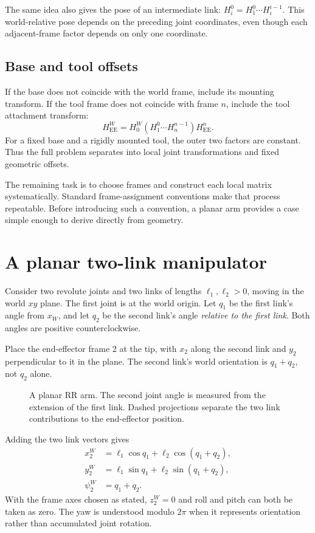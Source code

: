 The same idea also gives the pose of an intermediate link:
$H_i^0=H_1^0\cdots H_i^{i-1}$. This world-relative pose depends on the
preceding joint coordinates, even though each adjacent-frame factor
depends on only one coordinate.

\subsection{Base and tool offsets}
If the base does not coincide with the world frame, include its mounting
transform. If the tool frame does not coincide with frame $n$, include the
tool attachment transform:
\begin{equation}
 H_{\mathrm{EE}}^W
 =H_0^W\left(H_1^0\cdots H_n^{n-1}\right)H_{\mathrm{EE}}^n.
 \label{eq:l10-offsets}
\end{equation}
For a fixed base and a rigidly mounted tool, the outer two factors are
constant. Thus the full problem separates into local joint transformations
and fixed geometric offsets.

The remaining task is to choose frames and construct each local matrix
systematically. Standard frame-assignment conventions make that process
repeatable. Before introducing such a convention, a planar arm provides
a case simple enough to derive directly from geometry.

\section{A planar two-link manipulator}
Consider two revolute joints and two links of lengths $\ell_1,\ell_2>0$,
moving in the world $xy$ plane. The first joint is at the world origin.
Let $q_1$ be the first link's angle from $x_W$, and let $q_2$ be the second
link's angle \emph{relative to the first link}. Both angles are positive
counterclockwise.

Place the end-effector frame 2 at the tip, with $x_2$ along the second link
and $y_2$ perpendicular to it in the plane. The second link's world
orientation is $q_1+q_2$, not $q_2$ alone.

\begin{figure}[htbp]
\centering
\caption{A planar RR arm. The second joint angle is measured from the
extension of the first link. Dashed projections separate the two link
contributions to the end-effector position.}
\label{fig:l10-planar}
\end{figure}

Adding the two link vectors gives
\begin{equation}
 \boxed{\begin{aligned}
 x_2^W&=\ell_1\cos q_1+\ell_2\cos(q_1+q_2),\\
 y_2^W&=\ell_1\sin q_1+\ell_2\sin(q_1+q_2),\\
 \psi_2^W&=q_1+q_2.
 \end{aligned}}
 \label{eq:l10-planar}
\end{equation}
With the frame axes chosen as stated, $z_2^W=0$ and roll and pitch can
both be taken as zero. The yaw is understood modulo $2\pi$ when it
represents orientation rather than accumulated joint rotation.

